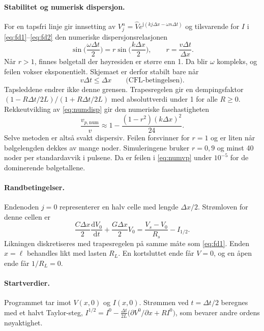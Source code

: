 \documentclass[11pt,a4paper]{article}
\numberwithin{equation}{section}
\numberwithin{figure}{section}
\numberwithin{table}{section}
\newcommand{\dd}{\mathrm{d}}
\newcommand{\jj}{\mathrm{j}}
\begin{document}
\paragraph{Stabilitet og numerisk dispersjon.}
For en tapsfri linje gir innsetting av $V_j^n = \hat Ve^{\jj(kj\Delta x - \omega n\Delta t)}$
og tilsvarende for $I$ i \eqref{eq:fd1}--\eqref{eq:fd2} den numeriske
dispersjonsrelasjonen \cite{taflove2005}
\begin{equation}
  \sin\Big(\frac{\omega\Delta t}{2}\Big) = r\sin\Big(\frac{k\Delta x}{2}\Big), \qquad
  r = \frac{v\Delta t}{\Delta x}. \label{eq:numdisp}
\end{equation}
Når $r > 1$, finnes bølgetall der høyresiden er større enn 1. Da blir $\omega$
kompleks, og feilen vokser eksponentielt. Skjemaet er derfor stabilt bare når
\begin{equation}
  v\Delta t \le \Delta x \qquad \text{(CFL-betingelsen)}. \label{eq:cfl}
\end{equation}
Tapsleddene endrer ikke denne grensen. Trapesregelen gir en dempingsfaktor
$(1 - R\Delta t/2L)/(1 + R\Delta t/2L)$ med absoluttverdi under 1 for alle $R \ge 0$.
Rekkeutvikling av \eqref{eq:numdisp} gir den numeriske fasehastigheten
\begin{equation}
  \frac{v_{p,\text{num}}}{v} \approx 1 - \frac{(1 - r^2)(k\Delta x)^2}{24}. \label{eq:numvp}
\end{equation}
Selve metoden er altså svakt dispersiv. Feilen forsvinner for $r = 1$ og er
liten når bølgelengden dekkes av mange noder. Simuleringene bruker $r = 0{,}9$
og minst 40 noder per standardavvik i pulsene. Da er feilen i \eqref{eq:numvp}
under $10^{-5}$ for de dominerende bølgetallene.

\paragraph{Randbetingelser.}
Endenoden $j = 0$ representerer en halv celle med lengde $\Delta x/2$.
Strømloven for denne cellen er
\begin{equation}
  \frac{C\Delta x}{2}\frac{\dd V_0}{\dd t} + \frac{G\Delta x}{2}V_0 = \frac{V_s - V_0}{R_s} - I_{1/2}.
\end{equation}
Likningen diskretiseres med trapesregelen på samme måte som \eqref{eq:fd1}. Enden
$x = \ell$ behandles likt med lasten $R_L$. En kortsluttet ende får $V = 0$, og en
åpen ende får $1/R_L = 0$.

\paragraph{Startverdier.}
Programmet tar imot $V(x,0)$ og $I(x,0)$. Strømmen ved $t = \Delta t/2$ beregnes med
et halvt Taylor-steg,
$I^{1/2} = I^0 - \frac{\Delta t}{2L}\big(\partial V^0/\partial x + RI^0\big)$,
som bevarer andre ordens nøyaktighet.
\end{document}
